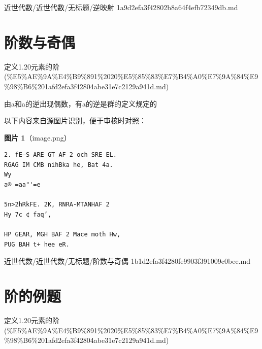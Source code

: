 \begin{note}[来源路径]

近世代数/近世代数/无标题/逆映射 1a9d2efa3f42802b8a64f4efb72349db.md

\end{note}

\section*{阶数与奇偶}

\begin{note}[来源上级主题]

定义1.20元素的阶 (\%E5\%AE\%9A\%E4\%B9\%891\%2020\%E5\%85\%83\%E7\%B4\%A0\%E7\%9A\%84\%E9\%98\%B6\%201afd2efa3f42804abe31e7c2129a941d.md)

\end{note}

\begin{note}[阶数与奇偶]

由a和a的逆出现偶数，有a的逆是群的定义规定的

\end{note}

\begin{note}
以下内容来自源图片识别，便于审核时对照：

\textbf{图片 1}（image.png）
\begin{Verbatim}[fontsize=\small]
2. fE—S ARE GT AF 2 och SRE EL.
RGAG IM CMB nihBka he, Bat 4a.
Wy
a® =aa"'=e

5n>2hRkFE. 2K, RNRA-MTANHAF 2
Hy 7c ¢ faq’,

HP GEAR, MGH BAF 2 Mace moth Hw,
PUG BAH t+ hee eR.
\end{Verbatim}

\end{note}

\begin{note}[来源路径]

近世代数/近世代数/无标题/阶数与奇偶 1b1d2efa3f4280fe9903f391009c0bee.md

\end{note}

\section*{阶的例题}

\begin{note}[来源上级主题]

定义1.20元素的阶 (\%E5\%AE\%9A\%E4\%B9\%891\%2020\%E5\%85\%83\%E7\%B4\%A0\%E7\%9A\%84\%E9\%98\%B6\%201afd2efa3f42804abe31e7c2129a941d.md)

\end{note}

